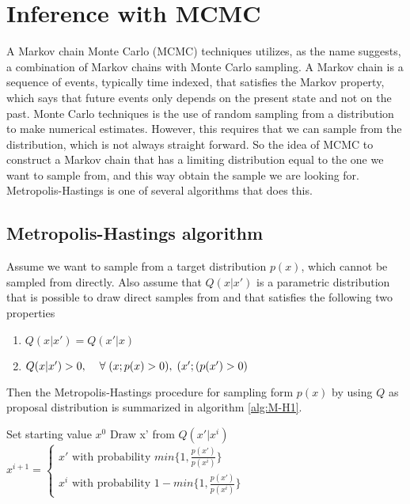 \section{Inference with MCMC}
\label{Bayesian}

A Markov chain Monte Carlo (MCMC) techniques utilizes, as the name suggests, a combination of Markov chains with Monte Carlo sampling. A Markov chain is a sequence of events, typically time indexed, that satisfies the Markov property, which says that future events only depends on the present state and not on the past. Monte Carlo techniques is the use of random sampling from a distribution to make numerical estimates. However, this requires that we can sample from the distribution, which is not always straight forward. So the idea of MCMC to construct a Markov chain that has a limiting distribution equal to the one we want to sample from, and this way obtain the sample we are looking for. Metropolis-Hastings is one of several algorithms that does this.

\subsection{Metropolis-Hastings algorithm}
\label{Metropolis}

Assume we want to sample from a target distribution $p(x)$, which cannot be sampled from directly. Also assume that $Q(x|x')$ is a parametric distribution that is possible to draw direct samples from and that satisfies the following two properties

\begin{enumerate}
    \item $Q(x|x') = Q(x'|x)$
    \item $Q(x|x')>0,   \hspace{4mm} \forall \; (x; p(x)>0), \; (x';(p(x')>0)$
\end{enumerate}

Then the Metropolis-Hastings procedure for sampling form $p(x)$ by using $Q$ as proposal distribution is summarized in algorithm \ref{alg:M-H1}.

\begin{algorithm}
\caption{}\label{alg:M-H1}
\begin{algorithmic}
\State Set starting value $x^0$
\State Draw x' from $Q(x'|x^i)$
\State $x^{i+1} = \begin{cases} x' \text{ with probability } min\{ 1, \frac{p(x')}{p(x^i)} \}\\ x^i \text{ with probability } 1-min\{ 1, \frac{p(x')}{p(x^i)} \}
\end{cases}$
\EndFor
\end{algorithmic}
\end{algorithm}

